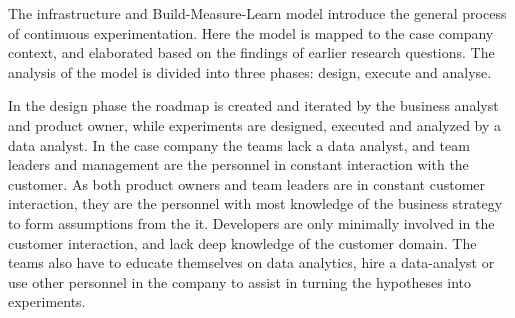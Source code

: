 \documentclass[english]{tktltiki2}
\theoremstyle{definition}
\theoremstyle{remark}
\begin{document}
The infrastructure and Build-Measure-Learn model \cite{fagerholm2014building} introduce the general process of continuous experimentation. Here the model is mapped to the case company context, and elaborated based on the findings of earlier research questions. The analysis of the model is divided into three phases: design, execute and analyse. 





In the design phase the roadmap is created and iterated by the business analyst and product owner, while experiments are designed, executed and analyzed by a data analyst. In the case company the teams lack a data analyst, and team leaders and management are the personnel in constant interaction with the customer. As both product owners and team leaders are in constant customer interaction, they are the personnel with most knowledge of the business strategy to form assumptions from the it. Developers are only minimally involved in the customer interaction, and lack deep knowledge of the customer domain. The teams also have to educate themselves on data analytics, hire a data-analyst or use other personnel in the company to assist in turning the hypotheses into experiments. 
\end{document}
